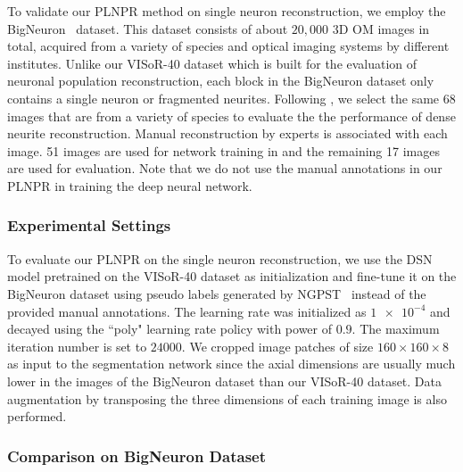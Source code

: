 To validate our PLNPR method on single neuron reconstruction, we employ the BigNeuron~\cite{peng2015} dataset.
This dataset consists of about $20,000$ 3D OM images in total, acquired from a variety of species and optical imaging systems by different institutes.
Unlike our VISoR-40 dataset which is built for the evaluation of neuronal population reconstruction, each block in the BigNeuron dataset only contains a single neuron or fragmented neurites.
Following \cite{Li2017}, we select the same 68 images that are from a variety of species to evaluate the the performance of dense neurite reconstruction.
Manual reconstruction by experts is associated with each image. 
51 images are used for network training in \cite{Li2017} and the remaining 17 images are used for evaluation.
Note that we do not use the manual annotations in our PLNPR in training the deep neural network. 


\subsubsection{Experimental Settings}
 
 
To evaluate our PLNPR on the single neuron reconstruction, we use the DSN model pretrained on the VISoR-40 dataset as initialization and fine-tune it on the BigNeuron dataset using pseudo labels generated by NGPST~\cite{Quan2015} instead of the provided manual annotations.
%
The learning rate was initialized as $\num{1e-4}$ and decayed using the ``poly" learning rate policy with power of $0.9$. The maximum iteration number is set to $ 24000 $. 
We cropped image patches of size $160\times 160\times 8$ as input to the segmentation network since the axial dimensions are usually much lower in the images of the BigNeuron dataset than our VISoR-40 dataset.
Data augmentation by transposing the three dimensions of each training image is also performed. 


\subsubsection{Comparison on BigNeuron Dataset}


